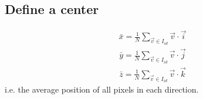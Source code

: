 \documentclass[letterpaper,10pt,english]{sphinxmanual}
\begin{document}
\noindent{}


\subsection{Define a center}
\label{\detokenize{06-ShapeAnalysis:define-a-center}}\begin{equation*}
\begin{split} \bar{x} = \frac{1}{N} \sum_{\vec{v}\in I_{id}} \vec{v}\cdot\vec{i} \end{split}
\end{equation*}\begin{equation*}
\begin{split} \bar{y} = \frac{1}{N} \sum_{\vec{v}\in I_{id}} \vec{v}\cdot\vec{j} \end{split}
\end{equation*}\begin{equation*}
\begin{split} \bar{z} = \frac{1}{N} \sum_{\vec{v}\in I_{id}} \vec{v}\cdot\vec{k} \end{split}
\end{equation*}
\sphinxAtStartPar
i.e. the average position of all pixels in each direction.
\end{document}
